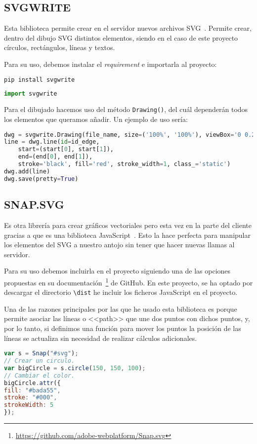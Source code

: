 \subsection{SVGWRITE}\label{svgwrite}
Esta biblioteca permite crear en el servidor nuevos archivos SVG~\cite{doc:svgwritedocs}. Permite crear, dentro del dibujo SVG distintos elementos, siendo en el caso de este proyecto círculos, rectángulos, líneas y textos. 

Para su uso, debemos instalar el \textit{requirement} e importarla al proyecto:
\renewcommand{\lstlistingname}{SVGWRITE}
\renewcommand{\lstlistlistingname}{List of \lstlistingname s}
\begin{lstlisting}[language=python,caption={Instalación mediante pip.}]
pip install svgwrite
\end{lstlisting}
\begin{lstlisting}[language=python,caption={Importación.}]
import svgwrite
\end{lstlisting}

Para el dibujado hacemos uso del método \texttt{Drawing()}, del cuál dependerán todos los elementos que queramos añadir. Un ejemplo de uso sería:
\begin{lstlisting}[language=python,caption={Ejemplo de uso.}]
dwg = svgwrite.Drawing(file_name, size=('100%', '100%'), viewBox='0 0.2 1 1.5', profile='full')
line = dwg.line(id=id_edge,
	start=(start[0], start[1]),
	end=(end[0], end[1]),
	stroke='black', fill='red', stroke_width=1, class_='static')
dwg.add(line)	
dwg.save(pretty=True)
\end{lstlisting}



\subsection{SNAP.SVG}\label{snapsvg}
Es otra librería para crear gráficos vectoriales pero esta vez en la parte del cliente gracias a que es una biblioteca JavaScript~\cite{doc:snapsvg}. Esto la hace perfecta para manipular los elementos del SVG a nuestro antojo sin tener que hacer nuevas llamas al servidor.

Para su uso debemos incluirla en el proyecto siguiendo una de las opciones propuestas en su documentación~\footnote{\url{https://github.com/adobe-webplatform/Snap.svg}} de GitHub. En este proyecto, se ha optado por descargar el directorio \texttt{\textbackslash{dist}} he incluir los ficheros JavaScript en el proyecto.

Una de las razones principales por las que he usado esta biblioteca es porque permite asociar las líneas o <<path>> que une dos puntos con dichos puntos, y, por lo tanto, si definimos una función para mover los puntos la posición de las líneas se actualiza sin necesidad de realizar cálculos adicionales.
\renewcommand{\lstlistingname}{Snap.svg}
\renewcommand{\lstlistlistingname}{List of \lstlistingname s}
\begin{lstlisting}[language=javascript,caption={Ejemplo}]
var s = Snap("#svg");
// Crear un circulo.
var bigCircle = s.circle(150, 150, 100);
// Cambiar el color.
bigCircle.attr({
fill: "#bada55",
stroke: "#000",
strokeWidth: 5
});
\end{lstlisting}


